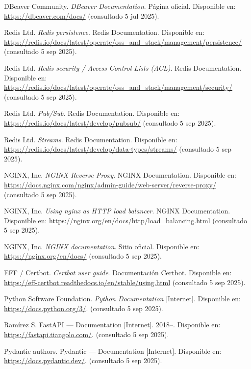 \documentclass[12pt, a4paper]{article}
\begin{document}
\begin{thebibliography}{9}
	DBeaver Community.
	\textit{DBeaver Documentation}. Página oficial.
	Disponible en: \url{https://dbeaver.com/docs/} (consultado 5 jul 2025).

Redis Ltd.
\textit{Redis persistence}. Redis Documentation.
Disponible en: \url{https://redis.io/docs/latest/operate/oss_and_stack/management/persistence/} (consultado 5 sep 2025).

Redis Ltd.
\textit{Redis security / Access Control Lists (ACL)}. Redis Documentation.
Disponible en: \url{https://redis.io/docs/latest/operate/oss_and_stack/management/security/} (consultado 5 sep 2025).

Redis Ltd.
\textit{Pub/Sub}. Redis Documentation.
Disponible en: \url{https://redis.io/docs/latest/develop/pubsub/} (consultado 5 sep 2025).

Redis Ltd.
\textit{Streams}. Redis Documentation.
Disponible en: \url{https://redis.io/docs/latest/develop/data-types/streams/} (consultado 5 sep 2025).

NGINX, Inc.
\textit{NGINX Reverse Proxy}. NGINX Documentation.
Disponible en: \url{https://docs.nginx.com/nginx/admin-guide/web-server/reverse-proxy/} (consultado 5 sep 2025).

NGINX, Inc.
\textit{Using nginx as HTTP load balancer}. NGINX Documentation.
Disponible en: \url{https://nginx.org/en/docs/http/load_balancing.html} (consultado 5 sep 2025).

NGINX, Inc.
\textit{NGINX documentation}. Sitio oficial.
Disponible en: \url{https://nginx.org/en/docs/} (consultado 5 sep 2025).

EFF / Certbot.
\textit{Certbot user guide}. Documentación Certbot.
Disponible en: \url{https://eff-certbot.readthedocs.io/en/stable/using.html} (consultado 5 sep 2025).

Python Software Foundation. 
\textit{Python Documentation} [Internet]. 
Disponible en: \url{https://docs.python.org/3/}. (consultado 5 sep 2025).

Ramírez S. FastAPI — Documentation [Internet]. 2018–. 
Disponible en: \url{https://fastapi.tiangolo.com/}. (consultado 5 sep 2025).

Pydantic authors. Pydantic — Documentation [Internet]. 
Disponible en: \url{https://docs.pydantic.dev/}. (consultado 5 sep 2025).


\end{thebibliography}
\end{document}
